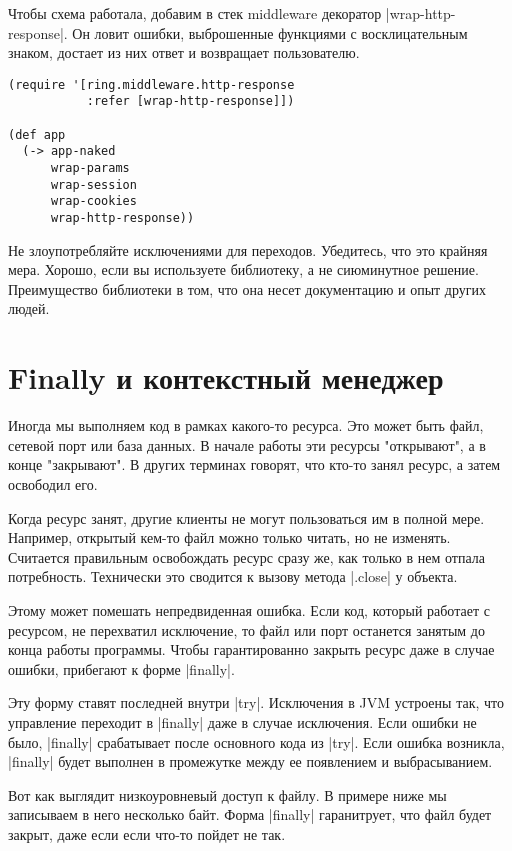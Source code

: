 Чтобы схема работала, добавим в стек middleware декоратор
\spverb|wrap-http-response|. Он ловит ошибки, выброшенные функциями с восклицательным
знаком, достает из них ответ и возвращает пользователю.

\begin{verbatim}
(require '[ring.middleware.http-response
           :refer [wrap-http-response]])

(def app
  (-> app-naked
      wrap-params
      wrap-session
      wrap-cookies
      wrap-http-response))
\end{verbatim}

Не злоупотребляйте исключениями для переходов. Убедитесь, что это крайняя
мера. Хорошо, если вы используете библиотеку, а не сиюминутное
решение. Преимущество библиотеки в том, что она несет документацию и опыт других
людей.

\section{Finally и контекстный менеджер}

Иногда мы выполняем код в рамках какого-то ресурса. Это может быть файл, сетевой
порт или база данных. В начале работы эти ресурсы "открывают", а в конце
"закрывают". В других терминах говорят, что кто-то занял ресурс, а затем
освободил его.

Когда ресурс занят, другие клиенты не могут пользоваться им в полной
мере. Например, открытый кем-то файл можно только читать, но не
изменять. Считается правильным освобождать ресурс сразу же, как только в нем
отпала потребность. Технически это сводится к вызову метода \spverb|.close| у объекта.

Этому может помешать непредвиденная ошибка. Если код, который работает с
ресурсом, не перехватил исключение, то файл или порт останется занятым до конца
работы программы. Чтобы гарантированно закрыть ресурс даже в случае ошибки,
прибегают к форме \spverb|finally|.

Эту форму ставят последней внутри \spverb|try|. Исключения в JVM устроены так, что
управление переходит в \spverb|finally| даже в случае исключения. Если ошибки не было,
\spverb|finally| срабатывает после основного кода из \spverb|try|. Если ошибка возникла,
\spverb|finally| будет выполнен в промежутке между ее появлением и выбрасыванием.

Вот как выглядит низкоуровневый доступ к файлу. В примере ниже мы записываем в
него несколько байт. Форма \spverb|finally| гаранитрует, что файл будет закрыт, даже
если если что-то пойдет не так.

